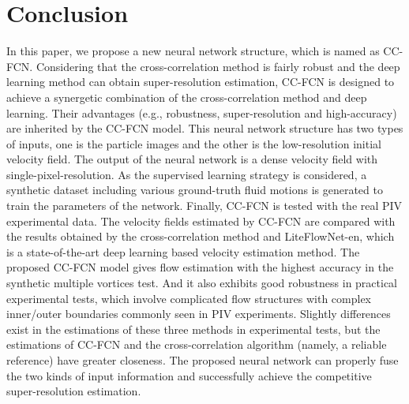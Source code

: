 \documentclass[%
 aip,
 amsmath,amssymb,
 reprint,%
]{revtex4-1}
\begin{document}
\section{Conclusion}
\label{sect5}
In this paper, we propose a new neural network structure, which is named as CC-FCN.
Considering that the cross-correlation method is fairly robust and the deep learning method can obtain super-resolution estimation, CC-FCN is designed to achieve a synergetic combination of the cross-correlation method and deep learning. Their advantages (e.g., robustness, super-resolution and high-accuracy) are inherited by the CC-FCN model.
This neural network structure has two types of inputs, one is the particle images and the other is the low-resolution initial velocity field. 
The output of the neural network is a dense velocity field with single-pixel-resolution. 
As the supervised learning strategy is considered, a synthetic dataset including various ground-truth fluid motions is generated to train the parameters of the network. 
Finally, CC-FCN is tested with the real PIV experimental data. The velocity fields estimated by CC-FCN are compared with the results obtained by the cross-correlation method and LiteFlowNet-en, which is a state-of-the-art deep learning based velocity estimation method. 
The proposed CC-FCN model gives flow estimation with the highest accuracy in the synthetic multiple vortices test. And it also exhibits good robustness in practical experimental tests, which involve complicated flow structures with complex inner/outer boundaries commonly seen in PIV experiments.
Slightly differences exist in the estimations of these three methods in experimental tests, but the estimations of CC-FCN and the cross-correlation algorithm (namely, a reliable reference) have greater closeness.
The proposed neural network can properly fuse the two kinds of input information and successfully achieve the competitive super-resolution estimation. 
\end{document}
